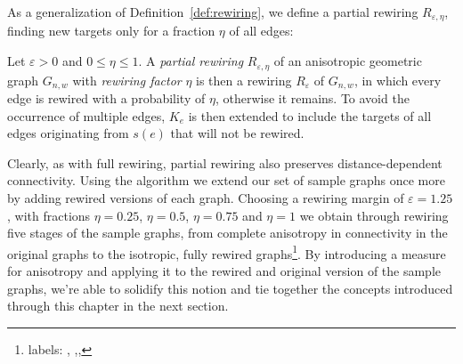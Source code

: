 As a generalization of Definition~\ref{def:rewiring}, we define a
partial rewiring $R_{\varepsilon, \eta}$, finding new targets only for
a fraction $\eta$ of all edges:

\begin{definition} 
  Let $\varepsilon > 0$ and $0 \leq \eta \leq 1$. A \textit{partial
    rewiring} $R_{\varepsilon,\eta}$ of an anisotropic geometric graph
  $G_{n,w}$ with \textit{rewiring factor} $\eta$
  is then a rewiring $R_{\varepsilon}$ of $G_{n,w}$, in which every edge
  is rewired with a probability of $\eta$, otherwise it remains. To
  avoid the occurrence of multiple edges, $K_e$ is then extended to
  include the targets of all edges originating from $s(e)$ that will not
  be rewired.
\end{definition}

Clearly, as with full rewiring, partial rewiring also preserves
distance-dependent connectivity. Using the algorithm we
extend our set of sample graphs once more by adding rewired versions
of each graph. Choosing a rewiring margin of $\varepsilon = 1.25$,
with fractions $\eta = 0.25$, $\eta = 0.5$, $\eta = 0.75$ and $\eta =
1$ we obtain through rewiring five stages of the sample graphs, from
complete anisotropy in connectivity in the original graphs to the
isotropic, fully rewired graphs\footnote{labels:
  ,
  ,,}. By introducing a
measure for anisotropy and applying it to the rewired and original
version of the sample graphs, we're able to solidify this notion and
tie together the concepts introduced through this chapter in the next
section.





 



